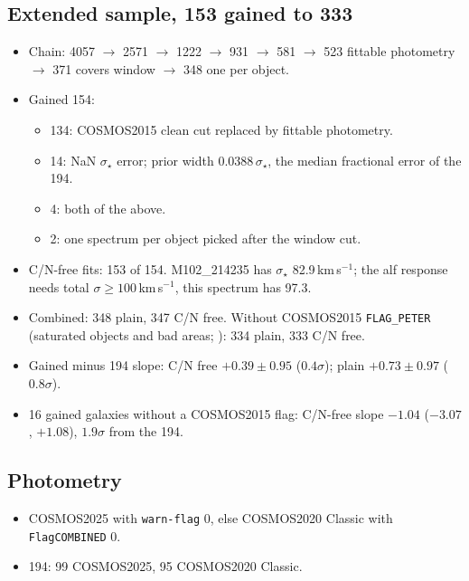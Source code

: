 \documentclass[fleqn,usenatbib]{mnras}
\newcommand{\sig}{\ensuremath{\sigma_\star}}
\begin{document}
\subsection{Extended sample, 153 gained to 333}
\begin{itemize}
\item Chain: 4057 $\to$ 2571 $\to$ 1222 $\to$ 931 $\to$ 581 $\to$ 523 fittable photometry $\to$ 371 covers window $\to$ 348 one per object.
\item Gained 154:
  \begin{itemize}
  \item 134: COSMOS2015 clean cut replaced by fittable photometry.
  \item 14: NaN \sig{} error; prior width $0.0388\,\sig$, the median fractional error of the 194.
  \item 4: both of the above.
  \item 2: one spectrum per object picked after the window cut.
  \end{itemize}
\item C/N-free fits: 153 of 154. M102\_214235 has \sig{} 82.9\,km\,s$^{-1}$; the alf response needs total $\sigma \ge 100$\,km\,s$^{-1}$, this spectrum has 97.3.
\item Combined: 348 plain, 347 C/N free. Without COSMOS2015 \texttt{FLAG\_PETER} (saturated objects and bad areas; \citealt{Laigle2016}): 334 plain, 333 C/N free.
\item Gained minus 194 slope: C/N free $+0.39\pm0.95$ ($0.4\sigma$); plain $+0.73\pm0.97$ ($0.8\sigma$).
\item 16 gained galaxies without a COSMOS2015 flag: C/N-free slope $-1.04$ ($-3.07$, $+1.08$), $1.9\sigma$ from the 194.
\end{itemize}

\subsection{Photometry}
\begin{itemize}
\item COSMOS2025 \citep{Shuntov2025} with \texttt{warn-flag} 0, else COSMOS2020 Classic \citep{Weaver2022} with \texttt{FlagCOMBINED} 0. 
\item 194: 99 COSMOS2025, 95 COSMOS2020 Classic. 
\end{itemize}
\end{document}
